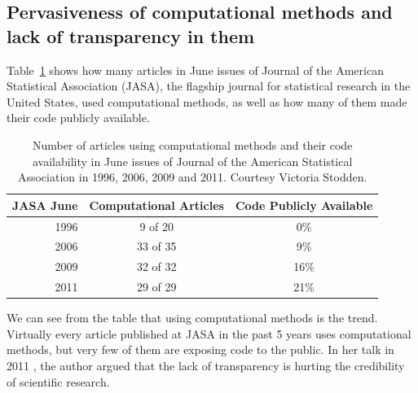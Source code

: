 \subsection{Pervasiveness of computational methods and lack of transparency in them}
Table~\ref{table:jasa} shows how many articles in June issues of Journal of the American Statistical Association (JASA), the flagship journal for statistical research in the United States, used computational methods, as well as how many of them made their code publicly available.
\begin{table}
	\centering
	\caption[Computational methods and code availability of JASA]{Number of articles using computational methods and their code availability in June issues of Journal of the American Statistical Association in 1996, 2006, 2009 and 2011. Courtesy Victoria Stodden.}
	\label{table:jasa}
	\begin{tabular}{r|cc}
		JASA June & Computational Articles & Code Publicly Available \\ 
		\hline 1996 & 9 of 20 & 0\% \\ 
		 2006 & 33 of 35 & 9\% \\ 
		 2009 & 32 of 32 & 16\% \\ 
		 2011 & 29 of 29 & 21\% \\  
	\end{tabular} 
\end{table}
We can see from the table that using computational methods is the trend. Virtually every article published at JASA in the past 5 years uses computational methods, but very few of them are exposing code to the public.
In her talk in 2011 \cite{stodden2011establishing}, the author argued that the lack of transparency is hurting the credibility of scientific research.

